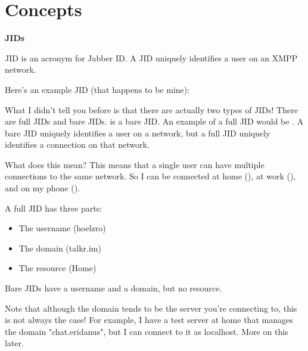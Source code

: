 \part{Concepts}

\newpage
\begin{center}
{\huge \bfseries JIDs}
\end{center}
\pause

JID is an acronym for Jabber ID.  A JID uniquely identifies a user on an XMPP network.

\pause

Here's an example JID (that happens to be mine): 

\pause

What I didn't tell you before is that there are actually two types of JIDs!  There are full JIDs
and bare JIDs.   is a bare JID.  An example of a full JID would be .
A bare JID uniquely identifies a user on a network, but a full JID uniquely identifies a connection on that
network.

\pause

What does this mean?  This means that a single user can have multiple connections to the same network.  So I can be
connected at home (), at work (), and on my phone ().

\pause

A full JID has three parts:
\pause

\begin{itemize}
\item The username (hoelzro)
\pause
\item The domain (talkr.im)
\pause
\item The resource (Home)
\end{itemize}
\pause

Bare JIDs have a username and a domain, but no resource.

\pause

Note that although the domain tends to be the server you're connecting to, this is not always the case!  For example, I have
a test server at home that manages the domain "chat.eridanus", but I can connect to it as localhost.  More on this later.
